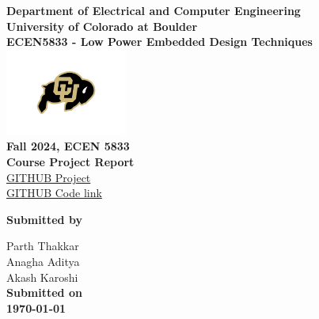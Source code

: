 \begin{titlepage}
\center %

\textbf{\large Department of Electrical and Computer Engineering}\\[0.5cm]
\textbf{\Large University of Colorado at Boulder}\\[1cm]
\textbf{\large ECEN5833 - Low Power Embedded Design Techniques}\\[2cm]
\includegraphics[width=0.3\textwidth]{figures/cu}\\[2cm] 

	
\textbf{\Huge Fall 2024, ECEN 5833 }\\[0.2cm]

\textbf{\Large Course Project Report}\\[2cm]
\href{https://github.com/users/parthishere/projects/2}{GITHUB Project}\\
\href{https://github.com/parthishere/Insane-Keyboard}{GITHUB Code link}
\vspace{1.5cm}



\vfill

\textbf{\large Submitted by}

{\large Parth Thakkar}\\
{\large Anagha Aditya}\\
{\large Akash Karoshi}\\[0.5cm]


\textbf{\large Submitted on}\\
\textbf{\Large \today} %


\vfill %

\end{titlepage}